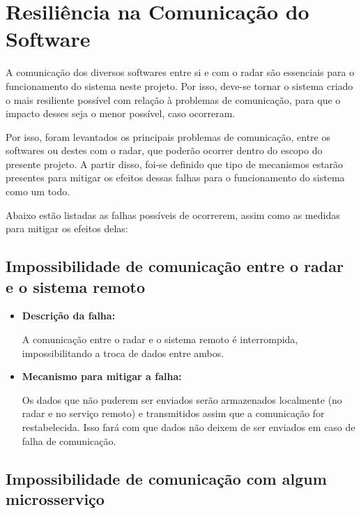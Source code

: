 \section{Resiliência na Comunicação do Software}

A comunicação dos diversos softwares entre si e com o radar são essenciais para o funcionamento do sistema neste projeto. Por isso, deve-se tornar o sistema criado o mais resiliente possível com relação à problemas de comunicação, para que o impacto desses seja o menor possível, caso ocorreram.

Por isso, foram levantados os principais problemas de comunicação, entre os softwares ou destes com o radar, que poderão ocorrer dentro do escopo do presente projeto. A partir disso, foi-se definido que tipo de mecanismos estarão presentes para mitigar os efeitos dessas falhas para o funcionamento do sistema como um todo.

Abaixo estão listadas as falhas possíveis de ocorrerem, assim como as medidas para mitigar os efeitos delas:

\subsection{Impossibilidade de comunicação entre o radar e o sistema remoto}

\begin{itemize}
    \item \textbf{Descrição da falha:}

    A comunicação entre o radar e o sistema remoto é interrompida, impossibilitando a troca de dados entre ambos.

    \item \textbf{Mecanismo para mitigar a falha:}

    Os dados que não puderem ser enviados serão armazenados localmente (no radar e no serviço remoto) e transmitidos assim que a comunicação for restabelecida. Isso fará com que dados não deixem de ser enviados em caso de falha de comunicação.
\end{itemize}

\subsection{Impossibilidade de comunicação com algum microsserviço}

